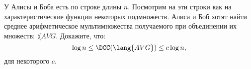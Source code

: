 У Алисы и Боба есть по строке длины $n$. Посмотрим на эти строки как на характеристические функции
некоторых подмножеств. Алиса и Боб хотят найти среднее арифметическое мультимножества получаемого при
объединении их множеств: $\lang{AVG}$. Докажите, что:
$$\log n \le \DCC(\lang{AVG}) \leq c \log n,$$
для некоторого $c$.
